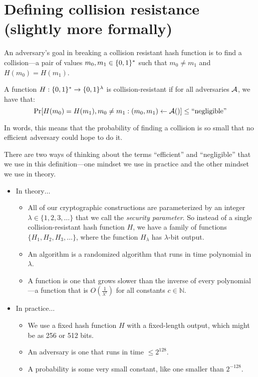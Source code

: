 \section{Defining collision resistance (slightly more formally)}
An adversary's goal in breaking a collision
resistant hash function is to find a collision---a
pair of values $m_0, m_1 \in \{0,1\}^*$ such that
$m_0 \neq m_1$ and $H(m_0) = H(m_1)$.

\begin{definition}\label{def:crhf}
	A function $H: \{0,1\}^* \rightarrow \{0,1\}^{\lambda}$ is collision-resistant 
  if for all  adversaries $\mathcal{A}$, we have that:
  \[ \Pr[H(m_0) = H(m_1), m_0 \neq m_1: (m_0, m_1) \leftarrow \mathcal{A}()] \leq \text{``negligible''} \]
\end{definition}

In words, this means that the probability of finding a collision is so small that no efficient adversary could hope to do it.

There are two ways of thinking about the terms ``efficient'' and ``negligible'' that 
we use in this definition---one mindset we use in practice and the other mindset we use in theory.

\begin{itemize}
	\item In theory$\ldots$
		\begin{itemize}
      \item All of our cryptographic constructions are parameterized by an integer $\lambda \in \{1, 2, 3, \dots\}$
            that we call the \textit{security parameter}.
            So instead of a single collision-resistant hash function $H$, we have a family of functions
            $\{ H_1, H_2, H_3, \dots \}$, where the function $H_\lambda$ has $\lambda$-bit output. 
			\item An  algorithm is a randomized algorithm that runs in time polynomial in $\lambda$.
			\item A  function is one that grows slower than the inverse of every polynomial---a function that is $O(\frac{1}{\lambda^c})$
            for all constants $c \in \mathbb{N}$.  
		\end{itemize}
	\item In practice$\ldots$
		\begin{itemize}
			\item We use a fixed hash function $H$ with a fixed-length output,
        which might be as 256 or 512 bits.
			\item An  adversary is one that runs in time $\leq 2^{128}$.
			\item A  probability is some very small constant, like one smaller than $2^{-128}$.
		\end{itemize}
\end{itemize}

